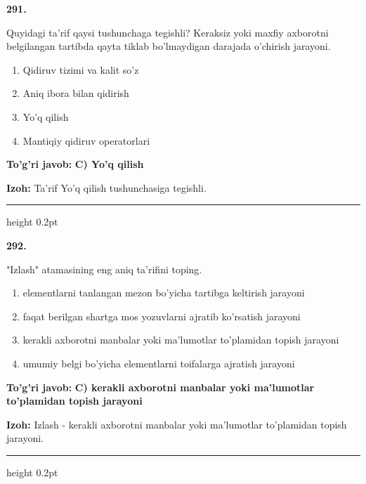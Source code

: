 \documentclass[10pt,a4paper,oneside]{article}
\begin{document}
\noindent\textbf{\color{ink}291.}
\par
Quyidagi ta'rif qaysi tushunchaga tegishli? Keraksiz yoki maxfiy axborotni belgilangan tartibda qayta tiklab bo'lmaydigan darajada o'chirish jarayoni.
\begin{enumerate}[label=\Alph*),leftmargin=9mm]
\item Qidiruv tizimi va kalit so'z
\item Aniq ibora bilan qidirish
\item Yo'q qilish
\item Mantiqiy qidiruv operatorlari
\end{enumerate}
\begin{tcolorbox}[enhanced,breakable,colback=teal!4,colframe=teal!50!black,boxrule=0.5pt,arc=1.1mm,left=3mm,right=3mm,top=1.7mm,bottom=1.7mm,before skip=2mm,after skip=2mm]
\textbf{\color{teal}To'g'ri javob:} \textbf{C) Yo'q qilish}
\par\smallskip
\textbf{Izoh:} Ta'rif Yo'q qilish tushunchasiga tegishli.
\end{tcolorbox}
\vspace{2mm}\hrule height 0.2pt \vspace{3mm}

\noindent\textbf{\color{ink}292.}
\par
"Izlash" atamasining eng aniq ta'rifini toping.
\begin{enumerate}[label=\Alph*),leftmargin=9mm]
\item elementlarni tanlangan mezon bo'yicha tartibga keltirish jarayoni
\item faqat berilgan shartga mos yozuvlarni ajratib ko'rsatish jarayoni
\item kerakli axborotni manbalar yoki ma'lumotlar to'plamidan topish jarayoni
\item umumiy belgi bo'yicha elementlarni toifalarga ajratish jarayoni
\end{enumerate}
\begin{tcolorbox}[enhanced,breakable,colback=teal!4,colframe=teal!50!black,boxrule=0.5pt,arc=1.1mm,left=3mm,right=3mm,top=1.7mm,bottom=1.7mm,before skip=2mm,after skip=2mm]
\textbf{\color{teal}To'g'ri javob:} \textbf{C) kerakli axborotni manbalar yoki ma'lumotlar to'plamidan topish jarayoni}
\par\smallskip
\textbf{Izoh:} Izlash - kerakli axborotni manbalar yoki ma'lumotlar to'plamidan topish jarayoni.
\end{tcolorbox}
\vspace{2mm}\hrule height 0.2pt \vspace{3mm}
\end{document}
